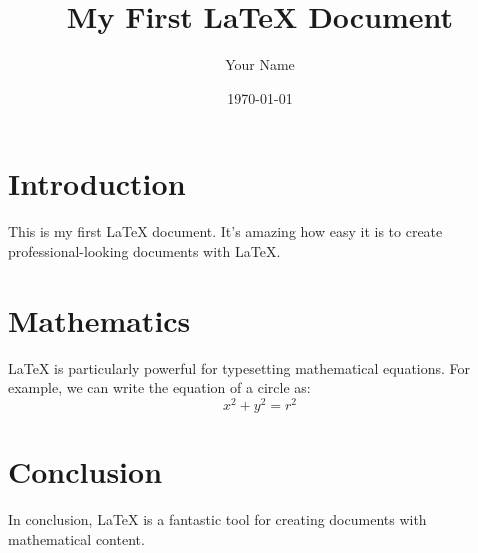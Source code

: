 \documentclass{article}
\begin{document}
\title{My First LaTeX Document}
\author{Your Name}
\date{\today}
\maketitle

\section{Introduction}
This is my first LaTeX document. It's amazing how easy it is to create professional-looking documents with LaTeX.

\section{Mathematics}
LaTeX is particularly powerful for typesetting mathematical equations. For example, we can write the equation of a circle as:
\[ x^2 + y^2 = r^2 \]

\section{Conclusion}
In conclusion, LaTeX is a fantastic tool for creating documents with mathematical content.
\end{document}
